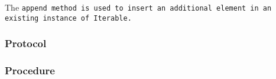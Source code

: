 \def\Subsubsection#1{\subsubsection{#1}
}

The \tt{append} method is used to insert an additional element in an existing
instance of \tt{Iterable}.

\Subsubsection{Protocol}

\Subsubsection{Procedure}
